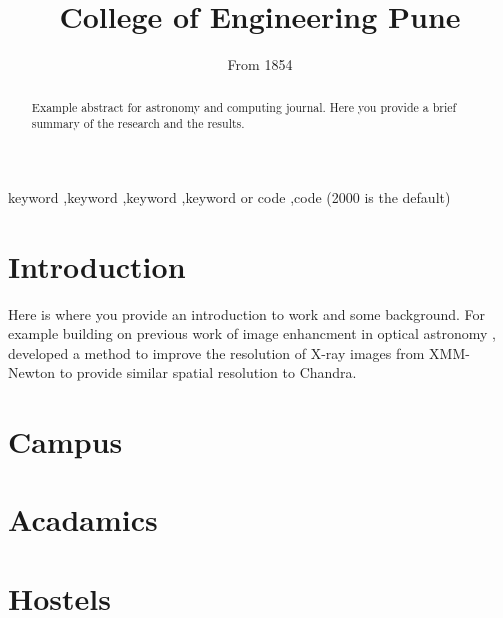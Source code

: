 \documentclass[final,5p,times,twocolumn,authoryear]{elsarticle}
\begin{document}
\begin{frontmatter}



\title{College of Engineering Pune}

      

\author[first]{From 1854}

\begin{abstract}

Example abstract for astronomy and computing journal. Here you provide a brief summary of the research and the results. 
\end{abstract}


\begin{keyword}

keyword \sep keyword \sep keyword \sep keyword
or \MSC[2008] code \sep code (2000 is the default)

\end{keyword}


\end{frontmatter}
\tableofcontents


\section{Introduction}
\label{introduction}

Here is where you provide an introduction to work and some background. For example building on previous work of image enhancment in optical astronomy \citep{vojtekova2021learning}, \cite{sweere2022deep} developed a method to improve the resolution of X-ray images from XMM-Newton to provide similar spatial resolution to Chandra.

\section{Campus}
\lipsum[1-4]
\section{Acadamics}
\lipsum[1-4]

\section{Hostels}
\lipsum[1-4]
\end{document}
